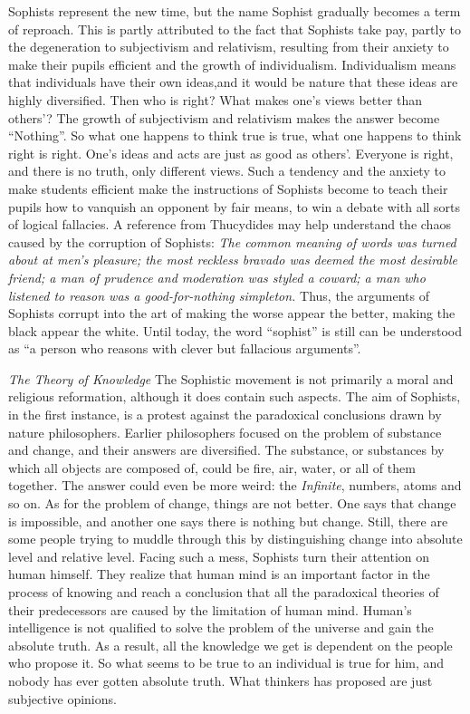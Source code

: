 \documentclass[11pt]{article}
\begin{document}
\begin{sloppypar}
Sophists represent the new time, but the name Sophist gradually becomes a term of reproach. 
This is partly attributed to the fact that Sophists take pay, partly to the degeneration to subjectivism and relativism, resulting from their anxiety to make their pupils efficient and the growth of individualism. 
Individualism means that individuals have their own ideas,and it would be nature that these ideas are highly diversified. 
Then who is right? 
What makes one’s views better than others’? 
The growth of subjectivism and relativism makes the answer become “Nothing”. 
So what one happens to think true is true, what one happens to think right is right. 
One’s ideas and acts are just as good as others’. 
Everyone is right, and there is no truth, only different views. 
Such a tendency and the anxiety to make students efficient make the instructions of Sophists become to teach their pupils how to vanquish an opponent by fair means, to win a debate with all sorts of logical fallacies. 
A reference from Thucydides may help understand the chaos caused by the corruption of Sophists:
\newline
\textit{The common meaning of words was turned about at men’s pleasure; the most reckless bravado was deemed the most desirable friend; a man of prudence and moderation was styled a coward; a man who listened to reason was a good-for-nothing simpleton.}
\newline
Thus, the arguments of Sophists corrupt into the art of making the worse appear the better, making the black appear the white. 
Until today, the word “sophist” is still can be understood as “a person who reasons with clever but fallacious arguments”.
  
\textit{The Theory of Knowledge}
The Sophistic movement is not primarily a moral and religious reformation, although it does contain such aspects. 
The aim of Sophists, in the first instance, is a protest against the paradoxical conclusions drawn by nature philosophers. 
Earlier philosophers focused on the problem of substance and change, and their answers are diversified. 
The substance, or substances by which all objects are composed of, could be fire, air, water, or all of them together. 
The answer could even be more weird: the \textit{Infinite}, numbers, atoms and so on. 
As for the problem of change, things are not better. 
One says that change is impossible, and another one says there is nothing but change. 
Still, there are some people trying to muddle through this by distinguishing change into absolute level and relative level. 
Facing such a mess, Sophists turn their attention on human himself. 
They realize that human mind is an important factor in the process of knowing and reach a conclusion that all the paradoxical theories of their predecessors are caused by the limitation of human mind. 
Human’s intelligence is not qualified to solve the problem of the universe and gain the absolute truth. 
As a result, all the knowledge we get is dependent on the people who propose it. 
So what seems to be true to an individual is true for him, and nobody has ever gotten absolute truth. 
What thinkers has proposed are just subjective opinions. 


\end{sloppypar}
\end{document}
